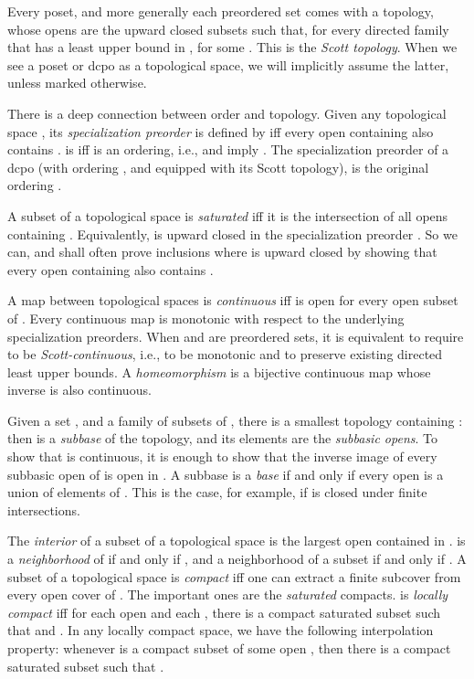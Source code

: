 \documentclass{LMCS}
\begin{document}
Every poset, and more generally each preordered set  comes with a
topology, whose opens  are the upward closed subsets such that, for
every directed family  that has a least upper bound
in ,  for some .  This is the {\em Scott
  topology\/}.  When we see a poset or dcpo  as a topological
space, we will implicitly assume the latter, unless marked otherwise.

There is a deep connection between order and topology.  Given any topological space , its {\em specialization preorder\/}
 is defined by  iff every open containing  also
contains .   is  iff  is an ordering, i.e.,  and  imply .  The specialization preorder of a
dcpo  (with ordering , and equipped with its Scott topology),
is the original ordering .

A subset  of a topological space  is {\em saturated\/} iff it is
the intersection of all opens  containing .  Equivalently, 
is upward closed in the specialization preorder \cite[Remark
after Definition~4.34]{Mislove:topo:CS}.  So we can, and shall often
prove inclusions  where  is upward closed by showing
that every open  containing  also contains .

A map  between topological spaces is {\em continuous\/}
iff  is open for every open subset  of .  Every
continuous map is monotonic with respect to the underlying
specialization preorders.  When  and  are preordered sets, it is
equivalent to require  to be {\em Scott-continuous\/}, i.e., to be
monotonic and to preserve existing directed least upper bounds.  A
{\em homeomorphism\/} is a bijective continuous map whose inverse is
also continuous.

Given a set , and a family  of subsets of , there is
a smallest topology containing : then  is a
{\em subbase\/} of the topology, and its elements are the {\em
  subbasic opens\/}.  To show that  is continuous, it is
enough to show that the inverse image of every subbasic open of  is
open in .  A subbase  is a \emph{base} if and only if
every open is a union of elements of .  This is the case,
for example, if  is closed under finite intersections.

The {\em interior\/}  of a subset  of a topological
space  is the largest open contained in .   is a
\emph{neighborhood} of  if and only if , and a
neighborhood of a subset  if and only if .
A subset  of a topological space  is {\em compact\/} iff one can
extract a finite subcover from every open cover of .  The important
ones are the {\em saturated\/} compacts.
 is {\em locally compact\/} iff for each open  and each , there is a compact saturated subset  such that  and .  In any locally compact space, we have the
following interpolation property: whenever  is a compact subset of
some open , then there is a compact saturated subset  such
that .
\end{document}
